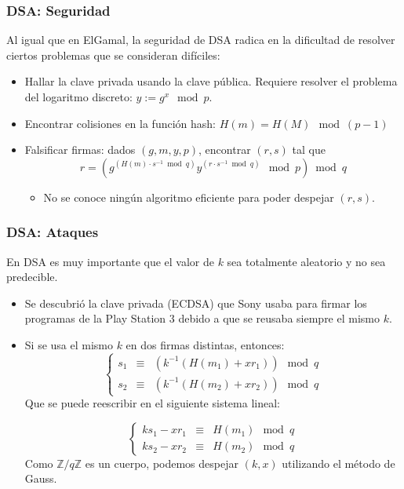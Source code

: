 \documentclass{beamer}
\begin{document}
\begin{frame}
    \frametitle{DSA: Seguridad}

    Al igual que en ElGamal, la seguridad de DSA radica en la dificultad de resolver ciertos problemas que se consideran difíciles:
    \begin{itemize}
        \item Hallar la clave privada usando la clave pública. Requiere resolver el problema del logaritmo discreto: $y := g^x \mod p$.
        \item Encontrar colisiones en la función hash: $H(m) = H(M) \mod \left(p-1\right) $
        \item Falsificar firmas: dados $(g, m, y, p)$, encontrar $(r, s)$ tal que 
        $$r = \left( g^{\left( H(m) \cdot s^{-1} \bmod q  \right)} y^{\left( r \cdot s^{-1} \bmod q  \right)} \mod p \right) \bmod q$$
        \begin{itemize}
            \item No se conoce ningún algoritmo eficiente para poder despejar $(r, s)$. 
            
        \end{itemize}
    \end{itemize}

\end{frame}

\begin{frame}
    \frametitle{DSA: Ataques}

    En DSA es muy importante que el valor de \alert{$k$ sea totalmente aleatorio} y no sea predecible.

    \begin{itemize}
        \item Se descubrió la clave privada (ECDSA) que Sony usaba para firmar los programas de la Play Station 3 debido a que se reusaba siempre el mismo $k$.
        \item Si se usa el mismo $k$ en dos firmas distintas, entonces:
        \[
            \left\{ \begin{array}{lll}
                s_1 & \equiv & \left( k^{-1} \left( H(m_1) + x r_1  \right) \right) \mod q \\
                s_2 & \equiv & \left( k^{-1} \left( H(m_2) + x r_2  \right) \right) \mod q
            \end{array}  \right.
        \] 
        Que se puede reescribir en el siguiente sistema lineal:

        \[
            \left\{ \begin{array}{lll}
                k s_1 - x r_1 & \equiv & H(m_1) \mod q \\
                k s_2 - x r_2 & \equiv & H(m_2) \mod q
            \end{array}  \right.
        \] 
        Como $\mathbb{Z}/q{\mathbb{Z}}$ es un cuerpo, podemos despejar $(k, x)$ utilizando el método de Gauss.
    \end{itemize}

\end{frame}
\end{document}
